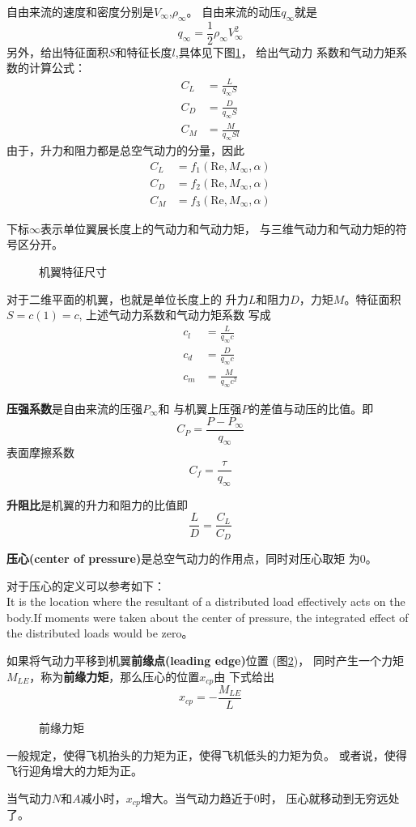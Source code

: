 自由来流的速度和密度分别是$V_\infty$,$\rho_\infty$。
自由来流的动压$q_\infty$就是
\[
  q_\infty=\frac{1}{2}\rho_\infty V_\infty ^2
\]
另外，给出特征面积$S$和特征长度$l$,具体见下图\ref{fig:reference_aera}，
给出气动力
系数和气动力矩系数的计算公式：
\begin{align*}
  C_L&=\frac{L}{q_\infty S}\\ 
  C_D&=\frac{D}{q_\infty S}\\ 
  C_M&=\frac{M}{q_\infty S l}
\end{align*}
由于，升力和阻力都是总空气动力的分量，因此
\begin{align*}
  C_L&=f_1(\mathrm{Re},M_\infty,\alpha)\\ 
  C_D&=f_2(\mathrm{Re},M_\infty,\alpha)\\ 
  C_M&=f_3(\mathrm{Re},M_\infty,\alpha)
\end{align*}
\begin{notice}
下标$\infty$表示单位翼展长度上的气动力和气动力矩，
与三维气动力和气动力矩的符号区分开。
\end{notice}
\begin{figure}[!ht]
  \center
  
  \caption{机翼特征尺寸}
  \label{fig:reference_aera}
\end{figure}
对于二维平面的机翼，也就是单位长度上的
升力$L$和阻力$D$，力矩$M$。特征面积
$S=c(1)=c$,
上述气动力系数和气动力矩系数
写成
\begin{align*}
  c_l&=\frac{L}{q_\infty c}\\ 
  c_d&=\frac{D}{q_\infty c}\\ 
  c_m&=\frac{M}{q_\infty c^2}
\end{align*}

{\bfseries 压强系数}是自由来流的压强$P_\infty$和
与机翼上压强$P$的差值与动压的比值。即
\[
  C_P=\frac{P-P_\infty}{q_\infty}
\]
表面摩擦系数
\[
  C_f=\frac{\tau}{q_\infty}
\]

{\bfseries 升阻比}是机翼的升力和阻力的比值即
\[
  \frac{L}{D}=\frac{C_L}{C_D}
\]

{\bfseries 压心(center of pressure)}是总空气动力的作用点，同时对压心取矩
为0。
\begin{notice}
对于压心的定义可以参考如下：\\ 
It is the location where the resultant of a distributed load effectively acts on the
body.If moments were taken about the center of pressure, the integrated effect of
the distributed loads would be zero。
\end{notice}

如果将气动力平移到机翼{\bfseries 前缘点(leading edge)}位置
(图\ref{fig:CenterOfPressure})，
同时产生一个力矩$M_{LE}$，称为{\bfseries 前缘力矩}，那么压心的位置$x_{cp}$由
下式给出
\[
  x_{cp}=-\frac{M_{LE}}{L}
\]
\begin{figure}[!ht]
  \center
  
  \caption{前缘力矩}
  \label{fig:CenterOfPressure}
\end{figure}

一般规定，使得飞机抬头的力矩为正，使得飞机低头的力矩为负。
或者说，使得飞行迎角增大的力矩为正。

当气动力$N$和$A$减小时，$x_{cp}$增大。当气动力趋近于0时，
压心就移动到无穷远处了。


